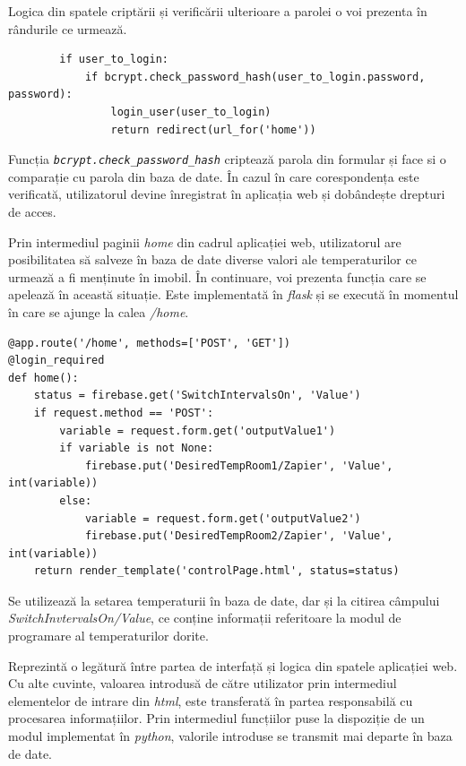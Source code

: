 	Logica din spatele criptării și verificării ulterioare a parolei o voi prezenta în rândurile ce urmează.

\vspace{1em}	
\begin{lstlisting}	
        if user_to_login:
            if bcrypt.check_password_hash(user_to_login.password, password):
                login_user(user_to_login)
                return redirect(url_for('home'))
\end{lstlisting}
\vspace{1em} 	

	Funcția \textit{\texttt{bcrypt.check\_password\_hash}} criptează parola din formular și face si o comparație cu parola din baza de date. În cazul în care corespondența este verificată, utilizatorul devine înregistrat în aplicația web și dobândește drepturi de acces.
  
\vspace{2em}

	Prin intermediul paginii \textit{home} din cadrul aplicației web, utilizatorul are posibilitatea să salveze în baza de date diverse valori ale temperaturilor ce urmează a fi menținute în imobil. În continuare, voi prezenta funcția care se apelează în această situație. Este implementată în \textit{flask} și se execută în momentul în care se ajunge la calea \textit{/home}. 

\vspace{1em}
\begin{lstlisting}
@app.route('/home', methods=['POST', 'GET'])
@login_required
def home():
    status = firebase.get('SwitchIntervalsOn', 'Value')
    if request.method == 'POST':
        variable = request.form.get('outputValue1')
        if variable is not None:
            firebase.put('DesiredTempRoom1/Zapier', 'Value', int(variable))
        else:
            variable = request.form.get('outputValue2')
            firebase.put('DesiredTempRoom2/Zapier', 'Value', int(variable))
    return render_template('controlPage.html', status=status)
\end{lstlisting}
\vspace{2em} 


	 Se utilizează la setarea temperaturii în baza de date, dar și la citirea câmpului \textit{SwitchInvtervalsOn/Value}, ce conține informații referitoare la modul de programare al temperaturilor dorite. 

	Reprezintă o legătură între partea de interfață și logica din spatele aplicației web. Cu alte cuvinte, valoarea introdusă de către utilizator prin intermediul elementelor de intrare din \textit{html}, este transferată în partea responsabilă cu procesarea informațiilor. Prin intermediul funcțiilor puse la dispoziție de un modul implementat în \textit{python}, valorile introduse se transmit mai departe în baza de date.

